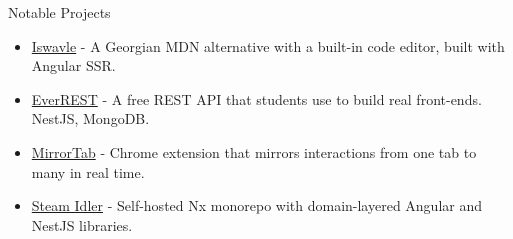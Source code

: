 \documentclass[
	a4paper,
	11pt,
]{resume}
\begin{document}
\begin{rSection}{Notable Projects}
	\begin{itemize}
		\item \href{https://iswavle.com}{Iswavle} - A Georgian MDN alternative with a built-in code editor, built with Angular SSR.
		\item \href{https://everrest.educata.dev/}{EverREST} - A free REST API that students use to build real front-ends. NestJS, MongoDB.
		\item \href{https://chromewebstore.google.com/detail/mirrortab/bljopdbabofhephejfdlmclnjjipihpb}{MirrorTab} - Chrome extension that mirrors interactions from one tab to many in real time.
		\item \href{https://github.com/KostaD02/steam-idler}{Steam Idler} - Self-hosted Nx monorepo with domain-layered Angular and NestJS libraries.
	\end{itemize}
\end{rSection}
\end{document}

